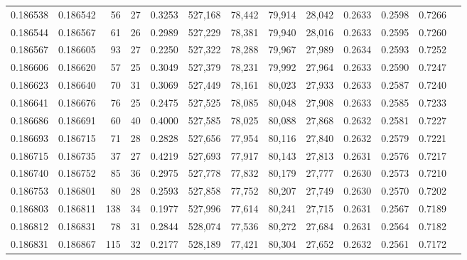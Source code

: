 \begin{tabular}{rrrrrrrrrrrrr}
0.186538 & 0.186542 &    56 &  27 &                                     0.3253 & 527,168 &  78,442 &  79,914 &  28,042 & 0.2633 & 0.2598 & 0.7266 \\
0.186544 & 0.186567 &    61 &  26 &                                     0.2989 & 527,229 &  78,381 &  79,940 &  28,016 & 0.2633 & 0.2595 & 0.7260 \\
0.186567 & 0.186605 &    93 &  27 &                                     0.2250 & 527,322 &  78,288 &  79,967 &  27,989 & 0.2634 & 0.2593 & 0.7252 \\
0.186606 & 0.186620 &    57 &  25 &                                     0.3049 & 527,379 &  78,231 &  79,992 &  27,964 & 0.2633 & 0.2590 & 0.7247 \\
0.186623 & 0.186640 &    70 &  31 &                                     0.3069 & 527,449 &  78,161 &  80,023 &  27,933 & 0.2633 & 0.2587 & 0.7240 \\
0.186641 & 0.186676 &    76 &  25 &                                     0.2475 & 527,525 &  78,085 &  80,048 &  27,908 & 0.2633 & 0.2585 & 0.7233 \\
0.186686 & 0.186691 &    60 &  40 &                                     0.4000 & 527,585 &  78,025 &  80,088 &  27,868 & 0.2632 & 0.2581 & 0.7227 \\
0.186693 & 0.186715 &    71 &  28 &                                     0.2828 & 527,656 &  77,954 &  80,116 &  27,840 & 0.2632 & 0.2579 & 0.7221 \\
0.186715 & 0.186735 &    37 &  27 &                                     0.4219 & 527,693 &  77,917 &  80,143 &  27,813 & 0.2631 & 0.2576 & 0.7217 \\
0.186740 & 0.186752 &    85 &  36 &                                     0.2975 & 527,778 &  77,832 &  80,179 &  27,777 & 0.2630 & 0.2573 & 0.7210 \\
0.186753 & 0.186801 &    80 &  28 &                                     0.2593 & 527,858 &  77,752 &  80,207 &  27,749 & 0.2630 & 0.2570 & 0.7202 \\
0.186803 & 0.186811 &   138 &  34 &                                     0.1977 & 527,996 &  77,614 &  80,241 &  27,715 & 0.2631 & 0.2567 & 0.7189 \\
0.186812 & 0.186831 &    78 &  31 &                                     0.2844 & 528,074 &  77,536 &  80,272 &  27,684 & 0.2631 & 0.2564 & 0.7182 \\
0.186831 & 0.186867 &   115 &  32 &                                     0.2177 & 528,189 &  77,421 &  80,304 &  27,652 & 0.2632 & 0.2561 & 0.7172 \\

\end{tabular}
